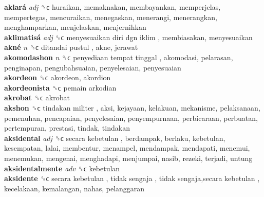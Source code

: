 \textbf{aklará} \emph{adj}  ␝ϲ  huraikan, memaknakan, membayankan, memperjelas, mempertegas, mencuraikan, menegaskan, menerangi, menerangkan, menghamparkan, menjelaskan, menjernihkan  \\
\textbf{aklimatisá} \emph{adj}  ␝ϲ   menyesuaikan diri dgn iklim , membiasakan, menyesuaikan  \\
\textbf{akné} \emph{n}  ␝ϲ   ditandai pustul , akne, jerawat  \\
\textbf{akomodashon} \emph{n}  ␝ϲ   penyediaan tempat tinggal , akomodasi, pelarasan, penginapan, pengubahsuaian, penyelesaian, penyesuaian  \\
\textbf{akordeon} ␝ϲ  akordeon, akordion  \\
\textbf{akordeonista} ␝ϲ   pemain arkodian   \\
\textbf{akrobat} ␝ϲ  akrobat  \\
\textbf{akshon} ␝ϲ   tindakan militer , aksi, kejayaan, kelakuan, mekanisme, pelaksanaan, pemenuhan, pencapaian, penyelesaian, penyempurnaan, perbicaraan, perbuatan, pertempuran, prestasi, tindak, tindakan  \\
\textbf{aksidental} \emph{adj}  ␝ϲ   secara kebetulan , berdampak, berlaku, kebetulan, kesempatan, lalai, membentur, menampel, mendampak, mendapati, menemui, menemukan, mengenai, menghadapi, menjumpai, nasib, rezeki, terjadi, untung  \\
\textbf{aksidentalmente} \emph{adv}  ␝ϲ  kebetulan  \\
\textbf{aksidente} ␝ϲ   secara kebetulan ,  tidak sengaja ,  tidak sengaja,secara kebetulan , kecelakaan, kemalangan, nahas, pelanggaran  \\
